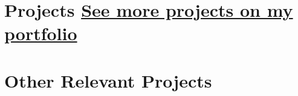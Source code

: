 \section*{Projects \hfill \href{https://harshanalf.netlify.app/projects}{See more projects on my portfolio}}

\ProjectNumberingtrue
\setcounter{projectCount}{0}










\section*{Other Relevant Projects}







\BigDivider
